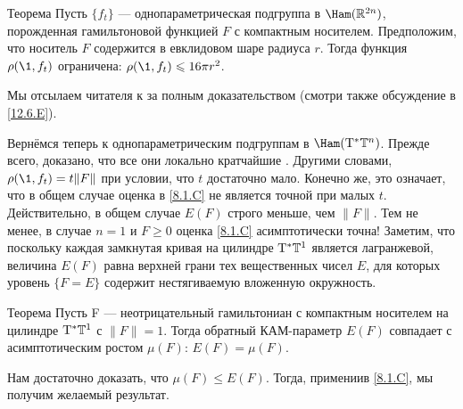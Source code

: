 \begin{thm}{Теорема}\label{8.2.A}
Пусть $\{f_t\}$ — однопараметрическая подгруппа в $\Ham (\RR^{2n})$,
порожденная гамильтоновой функцией $F$ с компактным носителем. 
Предположим, что носитель $F$ содержится в евклидовом шаре радиуса
$r$. 
Тогда функция $\rho (\1, f_t)$ ограничена: $\rho (\1, f_t) \z\le 16\pi
r^2$. 
\end{thm}

Мы отсылаем читателя к \cite[с. 177]{HZ} за полным доказательством (смотри также обсуждение в \ref{12.6.E}). 

Вернёмся теперь к однопараметрическим подгруппам в $\Ham (\T^\ast \TT^n)$.
Прежде всего, доказано, что все они локально кратчайшие \cite{LM2}.
Другими словами, $\rho (\1, f_t) = t \| F \|$ при условии, что $t$
достаточно мало. 
Конечно же, это означает, что в общем случае оценка в \ref{8.1.C} не является
точной при малых $t$. 
Действительно, в общем случае $E (F)$ строго меньше, чем $\| F \|$.
Тем не менее, в случае $n = 1$ и $F \ge 0$ оценка \ref{8.1.C}
асимптотически точна! 
Заметим, что поскольку каждая замкнутая кривая на цилиндре $\mathrm{T}^\ast
\mathbb{T}^1$ является лагранжевой, величина $E (F)$ равна верхней грани тех
вещественных чисел $E$, для которых уровень $\{F = E\}$ содержит
нестягиваемую вложенную окружность. 

\begin{thm}[(\cite{PS})]{Теорема}\label{8.2.B}
  Пусть F — неотрицательный гамильтониан с компактным носителем на
  цилиндре $\mathrm{T}^\ast \mathbb{T}^1$ с $\| F \| = 1$. 
  Тогда обратный КАМ-параметр $E (F)$ совпадает с асимптотическим
  ростом $\mu (F)$: $E (F) = \mu (F)$. 
\end{thm}

Нам достаточно доказать, что $\mu (F) \le E (F)$.
Тогда, примениив \ref{8.1.C}, мы получим желаемый результат.

